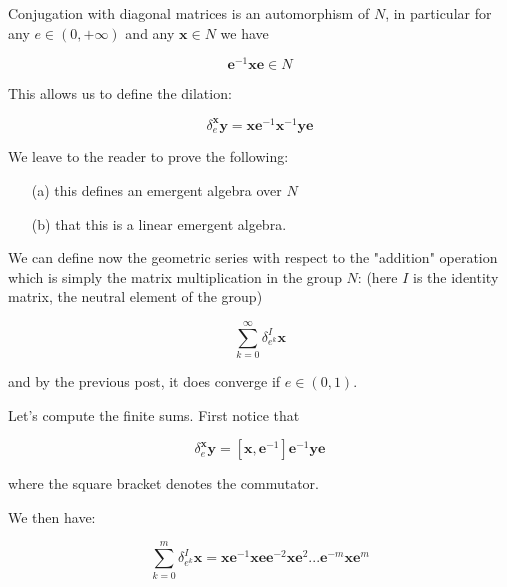 \documentclass{article}
\begin{document}
Conjugation with diagonal matrices is an automorphism of $N$, in particular for any $e \in (0,+\infty)$ and any $\mathbf{x} \in N$ we have 


$$ \mathbf{e}^{-1} \mathbf{x} \mathbf{e} \in N$$



This allows us to define the dilation: 







$$ \delta^{\mathbf{x}}_{e} \mathbf{y} = \mathbf{x} \mathbf{e}^{-1} \mathbf{x}^{-1} \mathbf{y} \mathbf{e}$$


We leave to the reader to prove the following:  
\begin{enumerate}
\item[(a)] this defines an emergent algebra over $N$

\item[(b)] that this is a linear emergent algebra.
\end{enumerate}






We can define now the geometric series with respect to the "addition" operation which is simply the matrix multiplication in the group $N$:  (here $I$ is the identity matrix, the neutral element of the group)







$$ \sum_{k=0}^{\infty} \delta_{e^{k}}^{I} \mathbf{x}$$



and by the previous post, it does converge if $e \in (0,1)$. 



Let's compute the finite sums. First notice that 



$$ \delta^{\mathbf{x}}_{e} \mathbf{y} = [\mathbf{x}, \mathbf{e}^{-1}]  \mathbf{e}^{-1} \mathbf{y} \mathbf{e}$$



where the square bracket denotes the commutator. 



We then have: 







$$ \sum_{k=0}^{m} \delta_{e^{k}}^{I} \mathbf{x} = \mathbf{x}\mathbf{e}^{-1} \mathbf{x} \mathbf{e} \mathbf{e}^{-2} \mathbf{x} \mathbf{e}^{2} ... \mathbf{e}^{-m} \mathbf{x} \mathbf{e}^{m}$$
\end{document}
